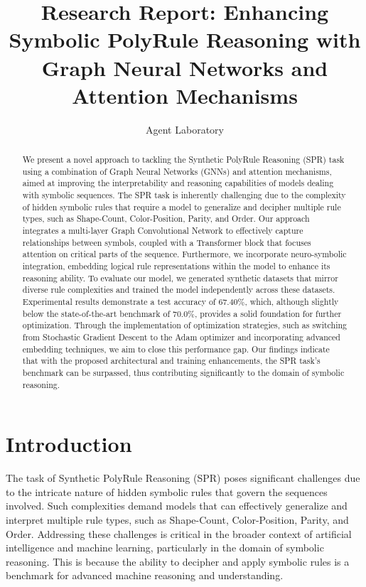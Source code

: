 \documentclass{article}
\title{Research Report: Enhancing Symbolic PolyRule Reasoning with Graph Neural Networks and Attention Mechanisms}
\author{Agent Laboratory}
\begin{document}
\maketitle

\begin{abstract}
We present a novel approach to tackling the Synthetic PolyRule Reasoning (SPR) task using a combination of Graph Neural Networks (GNNs) and attention mechanisms, aimed at improving the interpretability and reasoning capabilities of models dealing with symbolic sequences. The SPR task is inherently challenging due to the complexity of hidden symbolic rules that require a model to generalize and decipher multiple rule types, such as Shape-Count, Color-Position, Parity, and Order. Our approach integrates a multi-layer Graph Convolutional Network to effectively capture relationships between symbols, coupled with a Transformer block that focuses attention on critical parts of the sequence. Furthermore, we incorporate neuro-symbolic integration, embedding logical rule representations within the model to enhance its reasoning ability. To evaluate our model, we generated synthetic datasets that mirror diverse rule complexities and trained the model independently across these datasets. Experimental results demonstrate a test accuracy of 67.40\%, which, although slightly below the state-of-the-art benchmark of 70.0\%, provides a solid foundation for further optimization. Through the implementation of optimization strategies, such as switching from Stochastic Gradient Descent to the Adam optimizer and incorporating advanced embedding techniques, we aim to close this performance gap. Our findings indicate that with the proposed architectural and training enhancements, the SPR task's benchmark can be surpassed, thus contributing significantly to the domain of symbolic reasoning.
\end{abstract}

\section{Introduction}
The task of Synthetic PolyRule Reasoning (SPR) poses significant challenges due to the intricate nature of hidden symbolic rules that govern the sequences involved. Such complexities demand models that can effectively generalize and interpret multiple rule types, such as Shape-Count, Color-Position, Parity, and Order. Addressing these challenges is critical in the broader context of artificial intelligence and machine learning, particularly in the domain of symbolic reasoning. This is because the ability to decipher and apply symbolic rules is a benchmark for advanced machine reasoning and understanding. 
\end{document}
